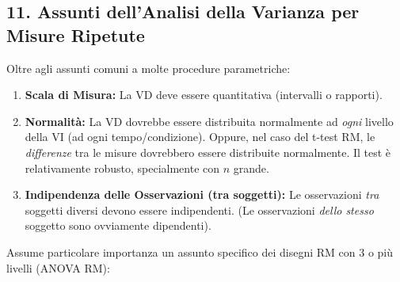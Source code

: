 \documentclass[12pt, a4paper]{article}
\begin{document}
\subsection*{11. Assunti dell'Analisi della Varianza per Misure Ripetute}
Oltre agli assunti comuni a molte procedure parametriche:
\begin{enumerate}
    \item \textbf{Scala di Misura:} La VD deve essere quantitativa (intervalli o rapporti).
    \item \textbf{Normalità:} La VD dovrebbe essere distribuita normalmente ad \textit{ogni} livello della VI (ad ogni tempo/condizione). Oppure, nel caso del t-test RM, le \textit{differenze} tra le misure dovrebbero essere distribuite normalmente. Il test è relativamente robusto, specialmente con $n$ grande.
    \item \textbf{Indipendenza delle Osservazioni (tra soggetti):} Le osservazioni \textit{tra} soggetti diversi devono essere indipendenti. (Le osservazioni \textit{dello stesso} soggetto sono ovviamente dipendenti).
\end{enumerate}
Assume particolare importanza un assunto specifico dei disegni RM con 3 o più livelli (ANOVA RM):
\end{document}
